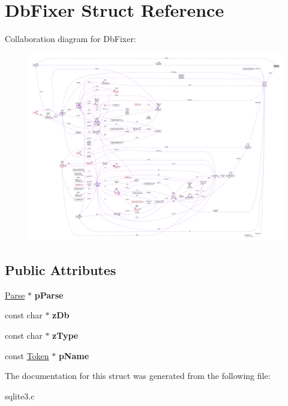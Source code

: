 \hypertarget{struct_db_fixer}{\section{Db\-Fixer Struct Reference}
\label{struct_db_fixer}
}


Collaboration diagram for Db\-Fixer\-:\nopagebreak
\begin{figure}[H]
\begin{center}
\leavevmode
\includegraphics[width=350pt]{struct_db_fixer__coll__graph}
\end{center}
\end{figure}
\subsection*{Public Attributes}
\begin{DoxyCompactItemize}
\item 
\hypertarget{struct_db_fixer_ac5c9b8bca3b05a66faea11dd998bf6f6}{\hyperlink{struct_parse}{Parse} $\ast$ {\bfseries p\-Parse}}\label{struct_db_fixer_ac5c9b8bca3b05a66faea11dd998bf6f6}

\item 
\hypertarget{struct_db_fixer_aba91df5965a99915d9180805d02c4a7f}{const char $\ast$ {\bfseries z\-Db}}\label{struct_db_fixer_aba91df5965a99915d9180805d02c4a7f}

\item 
\hypertarget{struct_db_fixer_ae4748d9e97560b7b332527434408c2e8}{const char $\ast$ {\bfseries z\-Type}}\label{struct_db_fixer_ae4748d9e97560b7b332527434408c2e8}

\item 
\hypertarget{struct_db_fixer_aedee20e10de7337651b84656ee81b39c}{const \hyperlink{struct_token}{Token} $\ast$ {\bfseries p\-Name}}\label{struct_db_fixer_aedee20e10de7337651b84656ee81b39c}

\end{DoxyCompactItemize}


The documentation for this struct was generated from the following file\-:\begin{DoxyCompactItemize}
\item 
sqlite3.\-c\end{DoxyCompactItemize}
